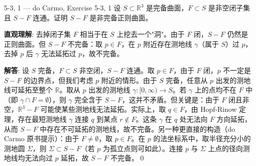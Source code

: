 \begin{exercise}{5-3, 1 — do Carmo, Exercise 5-3, 1}
设 $S \subset \mathbb{R}^3$ 是完备曲面，$F \subset S$ 是非空闭子集且 $S-F$ 连通。证明 $S-F$ 是非完备正则曲面。
\end{exercise}
\begin{solution}
\textbf{直观理解}: 去掉闭子集 $F$ 相当于在 $S$ 上挖去一个"洞"。由于 $F$ 闭，$S-F$ 仍然是正则曲面。但 $S-F$ 不完备：取 $p \in F$，在 $p$ 附近存在测地线 $\gamma$（属于 $S$）过 $p$，去掉 $p$ 后 $\gamma$ 无法延拓过 $p$，故不完备。

\textbf{解答}: 设 $S$ 完备，$F \subset S$ 非空闭，$S-F$ 连通。取 $p \in F$，由于 $F$ 闭，$p$ 不一定是 $S-F$ 的边界点，但我们考虑 $p$ 附近的情形。由于 $S$ 完备，任意从 $p$ 出发的测地线可延拓至整个 $\mathbb{R}$。取从 $p$ 出发的测地线 $\gamma: [0,\infty)\to S$。若 $\gamma$ 上的点均不在 $F$ 中（即 $\gamma\cap F = \emptyset$），则 $\gamma$ 完全含于 $S-F$，这并不矛盾。但关键是：由于 $F$ 闭且非空，$\mathbb{R}^3 - F$ 可能使某些测地线无法延拓。实际上，取 $q \in F$，由 Hopf-Rinow 定理，存在最短测地线 $\gamma$ 连接 $q$ 到某点 $r \notin F$。这条 $\gamma$ 在 $q$ 处无法向 $F$ 方向延拓，从而 $S-F$ 中存在不可延拓的测地线，故不完备。另一种更直接的构造（do Carmo 原书提示）：由于 $F \neq \emptyset$，取 $p \in F$。在 $p$ 的法坐标系中，取半径充分小的测地圆 $\Sigma$，则 $\Sigma \subset S-F$（若 $p$ 为孤立点则可如此）。连接 $p$ 与 $\Sigma$ 上点的径向测地线均无法向过 $p$ 延拓，故 $S-F$ 不完备。\qed
\end{solution}

